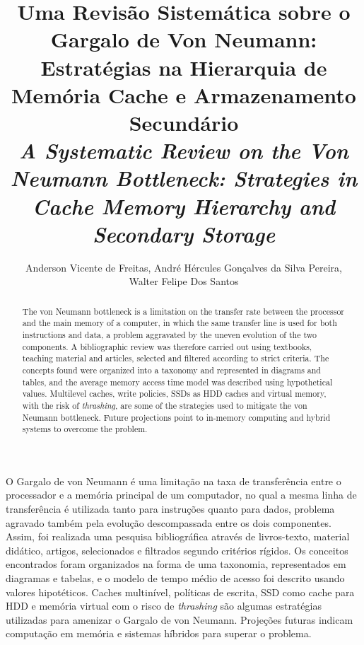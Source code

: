 \documentclass[12pt]{article}
\title{Uma Revisão Sistemática sobre o Gargalo de Von Neumann: Estratégias na Hierarquia de Memória Cache e Armazenamento Secundário \\
\medskip
\small{
    \textit{A Systematic Review on the Von Neumann Bottleneck: Strategies in Cache Memory Hierarchy and Secondary Storage}
}
}
\author{Anderson Vicente de Freitas\inst{1}, André Hércules Gonçalves da Silva Pereira\inst{1},\\ Walter Felipe Dos Santos\inst{1} }
\begin{document}
 

\maketitle

\thispagestyle{plain}

\begin{abstract}
The von Neumann bottleneck is a limitation on the transfer rate between the
processor and the main memory of a computer, in which the same transfer line
is used for both instructions and data, a problem aggravated by the uneven
evolution of the two components. A bibliographic review was therefore carried
out using textbooks, teaching material and articles, selected and filtered
according to strict criteria. The concepts found were organized into a
taxonomy and represented in diagrams and tables, and the average memory
access time model was described using hypothetical values. Multilevel
caches, write policies, SSDs as HDD caches and virtual memory, with the risk
of \textit{thrashing}, are some of the strategies used to mitigate the von
Neumann bottleneck. Future projections point to in-memory computing and
hybrid systems to overcome the problem.
\end{abstract}


\begin{resumo}
O Gargalo de von Neumann é uma limitação na taxa de transferência entre o
processador e a memória principal de um computador, no qual a mesma linha de
transferência é utilizada tanto para instruções quanto para dados, problema
agravado também pela evolução descompassada entre os dois componentes.
Assim, foi realizada uma pesquisa bibliográfica através de livros-texto,
material didático, artigos, selecionados e filtrados segundo critérios
rígidos. Os conceitos encontrados foram organizados na forma de uma
taxonomia, representados em diagramas e tabelas, e o modelo
de tempo médio de acesso foi descrito usando valores hipotéticos. Caches multinível,
políticas de escrita, SSD como cache para HDD e memória virtual com o risco de
\textit{thrashing} são algumas estratégias utilizadas para amenizar o
Gargalo de von Neumann. Projeções futuras indicam computação em memória e
sistemas híbridos para superar o problema.
\end{resumo}

\end{document}
